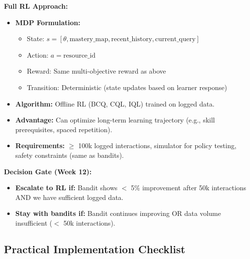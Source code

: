 \documentclass[11pt,letterpaper]{article}
\begin{document}
\textbf{Full RL Approach:}
\begin{itemize}
\item \textbf{MDP Formulation:}
\begin{itemize}
\item State: $s = [\theta, \text{mastery\_map}, \text{recent\_history}, \text{current\_query}]$
\item Action: $a = \text{resource\_id}$
\item Reward: Same multi-objective reward as above
\item Transition: Deterministic (state updates based on learner response)
\end{itemize}
\item \textbf{Algorithm:} Offline RL (BCQ, CQL, IQL) trained on logged data.
\item \textbf{Advantage:} Can optimize long-term learning trajectory (e.g., skill prerequisites, spaced repetition).
\item \textbf{Requirements:} $\geq$ 100k logged interactions, simulator for policy testing, safety constraints (same as bandits).
\end{itemize}

\textbf{Decision Gate (Week 12):}
\begin{itemize}
\item \textbf{Escalate to RL if:} Bandit shows $<$ 5\% improvement after 50k interactions AND we have sufficient logged data.
\item \textbf{Stay with bandits if:} Bandit continues improving OR data volume insufficient ($<$ 50k interactions).
\end{itemize}

\subsection{Practical Implementation Checklist}
\end{document}
